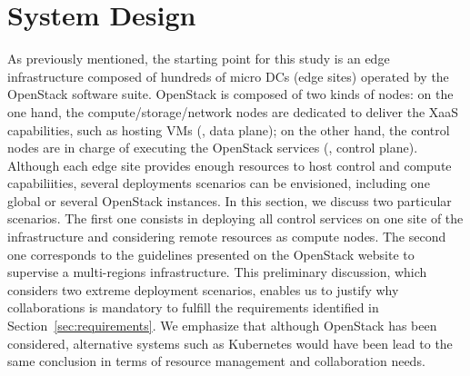 

\section{System Design}
\label{sec:system_design_considerations}
As previously mentioned, the starting point for this study is an edge
infrastructure composed of hundreds of micro DCs (\aka edge sites)
operated by the OpenStack software suite.
%
OpenStack is composed of two kinds
of nodes: on the one hand, the compute/storage/network nodes are
dedicated to deliver the XaaS capabilities, such as hosting VMs (\ie,
data plane); on the other hand, the control nodes are in charge of
executing the OpenStack services (\ie, control plane).
%
Although each edge site provides enough resources to host control and
compute capabiliities, several deployments scenarios can be
envisioned, including one global or several OpenStack instances. In
this section, we discuss two particular scenarios. The first one
consists in deploying all control services on one site of the
infrastructure and considering remote resources as compute
nodes.  The second one corresponds to the guidelines presented on the
OpenStack website to supervise a multi-regions infrastructure.
%
This preliminary discussion, which considers two extreme deployment
scenarios, enables us to justify why collaborations is mandatory to
fulfill the requirements identified in Section~\ref{sec:requirements}.
%
We emphasize that although OpenStack has been considered, alternative
systems such as Kubernetes would have been lead to the same conclusion
in terms of resource management and collaboration needs.  

